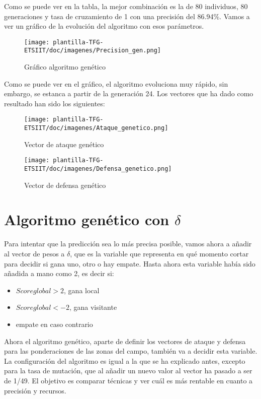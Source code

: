 Como se puede ver en la tabla, la mejor combinación es la de 80 individuos, 80 generaciones y tasa de cruzamiento de 1 con una precisión del 86.94\%. Vamos a ver un gráfico de la evolución del algoritmo con esos parámetros.

\begin{figure}[H]
    \centering
    \texttt{[image: plantilla-TFG-ETSIIT/doc/imagenes/Precision\_gen.png]}
    \caption{Gráfico algoritmo genético}
    \label{fig:etiqueta-imagen}
\end{figure}

Como se puede ver en el gráfico, el algoritmo evoluciona muy rápido, sin embargo, se estanca a partir de la generación 24. Los vectores que ha dado como resultado han sido los siguientes:

\begin{figure}[H]
    \centering
    \texttt{[image: plantilla-TFG-ETSIIT/doc/imagenes/Ataque\_genetico.png]}
    \caption{Vector de ataque genético}
    \label{fig:etiqueta-imagen}
\end{figure}

\begin{figure}[H]
    \centering
    \texttt{[image: plantilla-TFG-ETSIIT/doc/imagenes/Defensa\_genetico.png]}
    \caption{Vector de defensa genético}
    \label{fig:etiqueta-imagen}
\end{figure}

\section{Algoritmo genético con $\delta$}
Para intentar que la predicción sea lo más precisa posible, vamos ahora a añadir al vector de pesos a $\delta$, que es la variable que representa en qué momento cortar para decidir si gana uno, otro o hay empate. Hasta ahora esta variable había sido añadida a mano como 2, es decir si:

\begin{itemize}
    \item $Score global > 2$, gana local
    \item $Score global < -2$, gana visitante
    \item empate en caso contrario
\end{itemize}

Ahora el algoritmo genético, aparte de definir los vectores de ataque y defensa para las ponderaciones de las zonas del campo, también va a decidir esta variable. La configuración del algoritmo es igual a la que se ha explicado antes, excepto para la tasa de mutación, que al añadir un nuevo valor al vector ha pasado a ser de 1/49. El objetivo es comparar técnicas y ver cuál es más rentable en cuanto a precisión y recursos.

